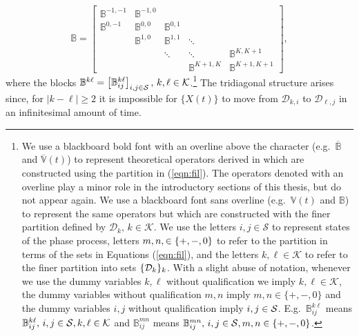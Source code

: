 \[\mathbb B = \left[
	\begin{array}{ccccc}
		\mathbb B^{{-1},{-1}}&\mathbb B^{{-1},0}& & & \\
		\mathbb B^{0,{-1}}&\mathbb B^{0,0}&\mathbb B^{0,1}&& \\
		&\mathbb B^{1,0}&\mathbb B^{1,1}&\ddots& \\
		& & \ddots & \ddots & \mathbb B^{K,{K+1}}\\
		& & & \mathbb B^{{K+1},K} & \mathbb B^{{K+1},{K+1}}
	\end{array}\right],\]
where the blocks \(\mathbb B^{k\ell}= \begin{bmatrix} \mathbb B_{ij}^{k\ell} \end{bmatrix}_{i,j\in\mathcal S},\,k,\ell\in\mathcal K\).\footnote{We use a blackboard bold font with an overline above the character (e.g.~\(\overline{\mathbb B}\) and \(\overline{\mathbb V}(t)\)) to represent theoretical operators derived in \citep{bo2014} which are constructed using the partition in (\ref{eqn:fil}). The operators denoted with an overline play a minor role in the introductory sections of this thesis, but do not appear again. We use a blackboard font sans overline (e.g.~\(\mathbb V(t)\) and \(\mathbb B\)) to represent the same operators but which are constructed with the finer partition defined by \(\mathcal D_k,\,k\in\mathcal K\). We use the letters \(i,j\in\mathcal S\) to represent states of the phase process, letters \(m,n,\in\mathcal \{+,-,0\}\) to refer to the partition in terms of the sets in Equations (\ref{eqn:fil}), and the letters \(k,\ell\in\mathcal K\) to refer to the finer partition into sets \(\{\mathcal{D}_k\}_k\). With a slight abuse of notation, whenever we use the dummy variables \(k,\ell\) without qualification we imply \(k,\ell\in\mathcal K\), the dummy variables without qualification \(m,n\) imply \(m,n\in\{+,-,0\}\) and the dummy variables \(i,j\) without qualification imply \(i,j\in\mathcal{S}\). E.g.~\(\mathbb B_{ij}^{k\ell}\) means \(\mathbb B_{ij}^{k\ell},\, i,j\in\mathcal{S}, k,\ell\in\mathcal K\) and \(\mathbb B_{ij}^{mn}\) means \(\mathbb B_{ij}^{mn},\, i,j\in\mathcal{S}, m,n\in\{+,-,0\}\).
} The tridiagonal structure arises since, for \(|k-\ell|\geq2\) it is impossible for \(\{X(t)\}\) to move from \(\mathcal D_{k,i}\) to \(\mathcal D_{\ell,j}\) in an infinitesimal amount of time.

